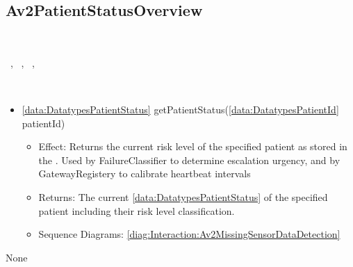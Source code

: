   \subsection{Av2PatientStatusOverview}\label{int:InterfacesAv2PatientStatusOverview}
    \begin{description}
      \item[Provided by:] \iconcomponent{}~
      \item[Required by:] \iconcomponent{}~, \iconcomponent{}~, \iconcomponent{}~, \iconcomponent{}~ 
      \item[Operations:] ~
    \begin{itemize}[noitemsep,nolistsep,leftmargin=-.25cm]
      \item \textsf{\ref{data:DatatypesPatientStatus} getPatientStatus(\ref{data:DatatypesPatientId} patientId)}
        \begin{itemize}[noitemsep,nolistsep]
           \item Effect: Returns the current risk level of the specified patient as stored in the . Used by FailureClassifier to determine escalation urgency, and by GatewayRegistery to calibrate heartbeat intervals 
           \item Returns: The current \ref{data:DatatypesPatientStatus} of the specified patient including their risk level classification.
           \item Sequence Diagrams: \cref{diag:Interaction:Av2MissingSensorDataDetection}
        \end{itemize}
    \end{itemize}
      \item[Diagrams:] None
    \end{description}

